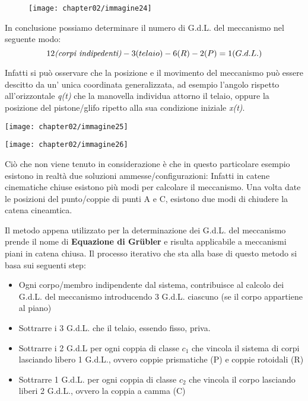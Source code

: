 \begin{enumerate}
			\begin{figure}[h]
		\centering
		\texttt{[image: chapter02/immagine24]}
		\end{figure}
		
		In conclusione possiamo determinare il numero di G.d.L. del meccanismo nel seguente modo:
		\begin{equation*}
		12\emph{(corpi indipedenti)} - 3 (telaio) - 6 (R) - 2 (P) = 1 (G.d.L.) 
		 \end{equation*}
		
		\begin{minipage}{.6\textwidth}
		Infatti si può osservare che la posizione e il movimento del meccanismo può essere descitto da un' unica coordinata generalizzata, ad esempio l'angolo rispetto all'orizzontale \emph{q(t)} che la manovella individua attorno il telaio, oppure la posizione del pistone/glifo ripetto alla sua condizione iniziale \emph{x(t)}.
		\end{minipage}
		\hfill
		\begin{minipage}{.4\textwidth}
		\texttt{[image: chapter02/immagine25]}
		\end{minipage}
		
		\begin{minipage}{.25\textwidth}
			\texttt{[image: chapter02/immagine26]}
		\end{minipage}
		\hfill
		\begin{minipage}{.65\textwidth}
		Ciò che non viene tenuto in considerazione è che in questo particolare esempio esistono in realtà due soluzioni ammesse/configurazioni:\newline
		Infatti in catene cinematiche chiuse esistono più modi per calcolare il meccanismo.\newline
		 Una volta date le posizioni del punto/coppie di punti A e C, esistono due modi di chiudere la catena cineamtica.
		\end{minipage}
		\vspace{3mm}
		
		Il metodo appena utilizzato per la determinazione dei G.d.L. del meccanismo prende il nome di  \textbf{Equazione di Gr\"ubler} e risulta applicabile a meccanismi piani in catena chiusa.
		Il processo iterativo che sta alla base di questo metodo si basa sui seguenti step:
		\begin{itemize}
		\item Ogni corpo/membro indipendente dal sistema, contribuisce al calcolo dei G.d.L. del meccanismo introducendo 3 G.d.L. ciascuno (se il corpo appartiene al piano)
		\item Sottrarre i 3 G.d.L. che il telaio, essendo fisso, priva.
		\item Sottrarre i 2 G.d.L per ogni coppia di classe $c_1$ che vincola il sistema di corpi lasciando libero 1 G.d.L., ovvero coppie prismatiche (P) e coppie rotoidali (R)
		\item Sottrarre 1 G.d.L. per ogni coppia di classe $c_2$ che vincola il corpo lasciando liberi 2 G.d.L., ovvero la coppia a camma (C)  
 		\end{itemize} 
 		

\end{enumerate}
